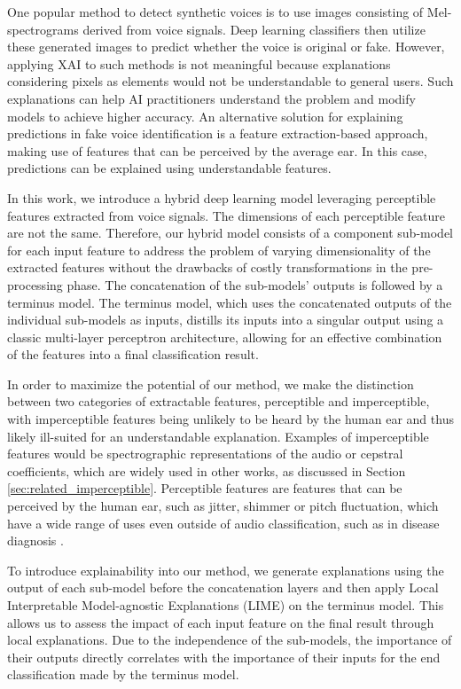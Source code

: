 \documentclass{article}
\begin{document}
One popular method to detect synthetic voices is to use images consisting of Mel-spectrograms derived from voice signals. Deep learning classifiers then utilize these generated images to predict whether the voice is original or fake. However, applying XAI to such methods is not meaningful because explanations considering pixels as elements would not be understandable to general users. Such explanations can help AI practitioners understand the problem and modify models to achieve higher accuracy. An alternative solution for explaining predictions in fake voice identification is a feature extraction-based approach, making use of features that can be perceived by the average ear. In this case, predictions can be explained using understandable features.

In this work, we introduce a hybrid deep learning model leveraging perceptible features extracted from voice signals. The dimensions of each perceptible feature are not the same. Therefore, our hybrid model consists of a component sub-model for each input feature to address the problem of varying dimensionality of the extracted features without the drawbacks of costly transformations in the pre-processing phase. The concatenation of the sub-models' outputs is followed by a terminus model. The terminus model, which uses the concatenated outputs of the individual sub-models as inputs, distills its inputs into a singular output using a classic multi-layer perceptron architecture, allowing for an effective combination of the features into a final classification result.

In order to maximize the potential of our method, we make the distinction between two categories of extractable features, perceptible and imperceptible, with imperceptible features being unlikely to be heard by the human ear and thus likely ill-suited for an understandable explanation. Examples of imperceptible features would be spectrographic representations of the audio or cepstral coefficients, which are widely used in other works, as discussed in Section \ref{sec:related_imperceptible}. Perceptible features are features that can be perceived by the human ear, such as jitter, shimmer or pitch fluctuation, which have a wide range of uses even outside of audio classification, such as in disease diagnosis \cite{chaiwongyen_deepfake-speech_2023}.

To introduce explainability into our method, we generate explanations using the output of each sub-model before the concatenation layers and then apply Local Interpretable Model-agnostic Explanations (LIME) \cite{ribeiro_why_2016} on the terminus model. This allows us to assess the impact of each input feature on the final result through local explanations. Due to the independence of the sub-models, the importance of their outputs directly correlates with the importance of their inputs for the end classification made by the terminus model.
\end{document}
